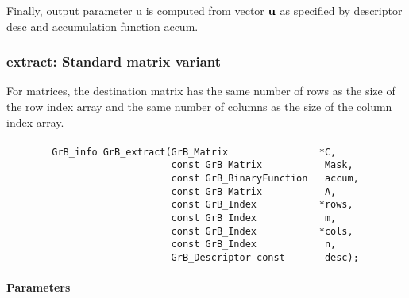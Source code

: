 Finally, output parameter {\sf u} is computed from vector ${\bf u}$ as
specified by descriptor {\sf desc} and accumulation function {\sf accum}.



\subsubsection{{\sf extract}: Standard matrix variant}

For matrices, the destination matrix has
the same number of rows as the size of the row index array and the same
number of columns as the size of the column index array.

\paragraph{\syntax}

\begin{verbatim}                 
        GrB_info GrB_extract(GrB_Matrix                *C,
                             const GrB_Matrix           Mask,
                             const GrB_BinaryFunction   accum,
                             const GrB_Matrix           A,
                             const GrB_Index           *rows,
                             const GrB_Index            m,
                             const GrB_Index           *cols,
                             const GrB_Index            n,
                             GrB_Descriptor const       desc);
\end{verbatim}

\paragraph{Parameters}

